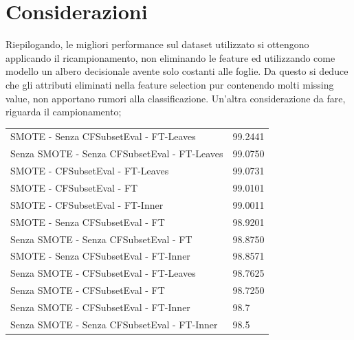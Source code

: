 \section{Considerazioni}
Riepilogando, le migliori performance sul dataset utilizzato si ottengono applicando il ricampionamento, non eliminando le feature ed utilizzando come modello un albero decisionale avente solo costanti alle foglie.
Da questo si deduce che gli attributi eliminati nella feature selection pur contenendo molti missing value, non apportano rumori alla classificazione.
Un'altra considerazione da fare, riguarda il campionamento; 
\begin{table}[htbp]
	\begin{tabular}{ll}
		SMOTE - Senza CFSubsetEval - FT-Leaves	& 99.2441 \\
		Senza SMOTE - Senza CFSubsetEval - FT-Leaves & 99.0750 \\
		SMOTE - CFSubsetEval - FT-Leaves & 99.0731 \\
		SMOTE - CFSubsetEval - FT & 99.0101 \\
		SMOTE - CFSubsetEval - FT-Inner	& 99.0011 \\		
		SMOTE - Senza CFSubsetEval - FT & 98.9201 \\
		Senza SMOTE - Senza CFSubsetEval - FT & 98.8750 \\
		SMOTE - Senza CFSubsetEval - FT-Inner & 98.8571 \\
		Senza SMOTE - CFSubsetEval - FT-Leaves & 98.7625 \\
		Senza SMOTE - CFSubsetEval - FT & 98.7250 \\
		Senza SMOTE - CFSubsetEval - FT-Inner & 98.7 \\
		Senza SMOTE - Senza CFSubsetEval - FT-Inner & 98.5 \\
	\end{tabular}
\end{table}













